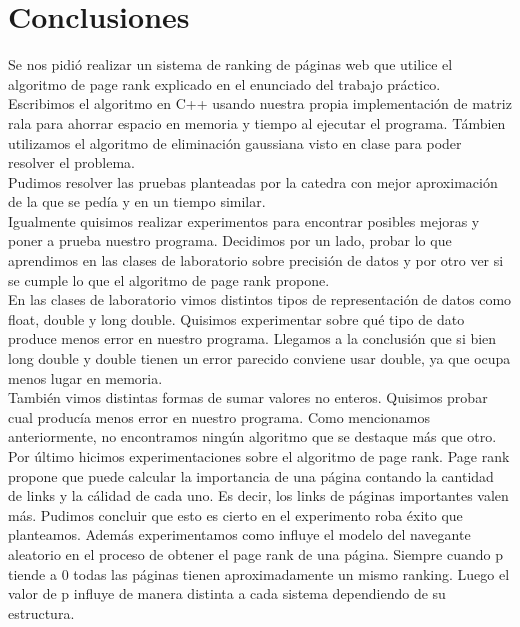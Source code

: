 \section{Conclusiones}

Se nos pidió realizar un sistema de ranking de páginas web que utilice el algoritmo de page rank explicado en el enunciado del trabajo práctico.\\

Escribimos el algoritmo en C++ usando nuestra propia implementación de matriz rala para ahorrar espacio en memoria y tiempo al ejecutar el programa. Támbien utilizamos el algoritmo de eliminación gaussiana visto en clase para poder resolver el problema.\\

Pudimos resolver las pruebas planteadas por la catedra con mejor aproximación de la que se pedía y en un tiempo similar.\\

Igualmente quisimos realizar experimentos para encontrar posibles mejoras y poner a prueba nuestro programa. Decidimos por un lado, probar lo que aprendimos en las clases de laboratorio sobre precisión de datos y por otro ver si se cumple lo que el algoritmo de page rank propone.\\

En las clases de laboratorio vimos distintos tipos de representación de datos como float, double y long double. Quisimos experimentar sobre qué tipo de dato produce menos error en nuestro programa. Llegamos a la conclusión que si bien long double y double tienen un error parecido conviene usar double, ya que ocupa menos lugar en memoria.\\

También vimos distintas formas de sumar valores no enteros. Quisimos probar cual producía menos error en nuestro programa. Como mencionamos anteriormente, no encontramos ningún algoritmo que se destaque más que otro.\\

Por último hicimos experimentaciones sobre el algoritmo de page rank. Page rank propone que puede calcular la importancia de una página contando la cantidad de links y la cálidad de cada uno. Es decir, los links de páginas importantes valen más. Pudimos concluir que esto es cierto en el experimento roba éxito que planteamos. Además experimentamos como influye el modelo del navegante aleatorio en el proceso de obtener el page rank de una página. Siempre cuando p tiende a 0 todas las páginas tienen aproximadamente un mismo ranking. Luego el valor de p influye de manera distinta a cada sistema dependiendo de su estructura.